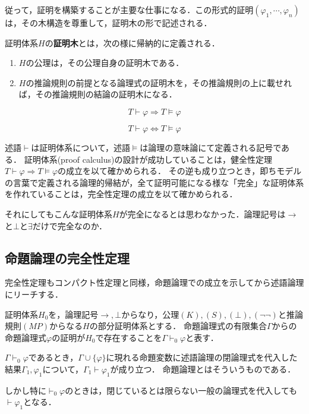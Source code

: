 \documentclass[uplatex, 12pt, dvipdfmx]{jsreport}
\begin{document}
従って，証明を構築することが主要な仕事になる．この形式的証明$(\varphi_1,\cdots,\varphi_n)$は，その木構造を尊重して，証明木の形で記述される．
\begin{definition}
    証明体系$H$の\textbf{証明木}とは，次の様に帰納的に定義される．
    \begin{enumerate}
        \item $H$の公理は，その公理自身の証明木である．
        \item $H$の推論規則の前提となる論理式の証明木を，その推論規則の上に載せれば，その推論規則の結論の証明木になる．
    \end{enumerate}
\end{definition}

\begin{theorem}
    \[ T\vdash\varphi\Rightarrow T\vDash\varphi \]
\end{theorem}

\begin{theorem}
    \[ T\vdash\varphi\Leftrightarrow T\vDash\varphi \]
\end{theorem}

\begin{itembox}
    述語$\vdash$は証明体系について，述語$\vDash$は論理の意味論にて定義される記号である．
    証明体系(proof calculus)の設計が成功していることは，健全性定理$T\vdash\varphi\Rightarrow T\vDash\varphi$の成立を以て確かめられる．
    その逆も成り立つとき，即ちモデルの言葉で定義される論理的帰結が，全て証明可能になる様な「完全」な証明体系を作れていることは，完全性定理の成立を以て確かめられる．

    それにしてもこんな証明体系$H$が完全になるとは思わなかった．論理記号は$\to$と$\bot$と$\exists$だけで完全なのか．
\end{itembox}

\subsection{命題論理の完全性定理}
完全性定理もコンパクト性定理と同様，命題論理での成立を示してから述語論理にリーチする．

\begin{definition}[証明体系Hの命題論理部分]
    証明体系$H_0$を，論理記号$\to,\bot$からなり，公理$(K),(S),(\bot),(\lnot\lnot)$と推論規則$(MP)$からなる$H$の部分証明体系とする．
    命題論理式の有限集合$\Gamma$からの命題論理式$\varphi$の証明が$H_0$で存在することを$\Gamma\vdash_0\varphi$と表す．
\end{definition}
\begin{remark}
    $\Gamma\vdash_0\varphi$であるとき，$\Gamma\cup\{\varphi\}$に現れる命題変数に述語論理の閉論理式を代入した結果$\Gamma_1,\varphi_1$について，$\Gamma_1\vdash\varphi_1$が成り立つ．
    命題論理とはそういうものである．

    しかし特に$\vdash_0\varphi$のときは，閉じているとは限らない一般の論理式を代入しても$\vdash\varphi_1$となる．
\end{remark}
\end{document}
